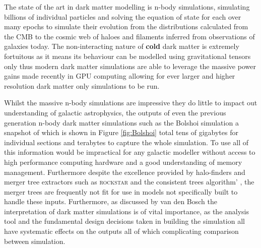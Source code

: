 The state of the art in dark matter modelling is n-body simulations, simulating billions of individual particles and solving the equation of state for each over many epochs to simulate their evolution from the distributions calculated from the CMB to the cosmic web of haloes and filaments inferred from observations of galaxies today. The non-interacting nature of \textbf{cold} dark matter is extremely fortuitous as it means its behaviour can be modelled using gravitational tensors only thus modern dark matter simulations are able to leverage the massive power gains made recently in GPU computing allowing for ever larger and higher resolution dark matter only simulations to be run. 

Whilst the massive n-body simulations are impressive they do little to impact out understanding of galactic astrophysics, the outputs of even the previous generation n-body dark matter simulations such as the Bolshoi simulation a snapshot of which is shown in Figure \ref{fig:Bolshoi} total tens of gigabytes for individual sections and terabytes to capture the whole simulation. To use all of this information would be impractical for any galactic modeller without access to high performance computing hardware and a good understanding of memory management. Furthermore despite the excellence provided by halo-finders and merger tree extractors such as \textsc{rockstar} \cite{Behroozi2013THECORES} and the consistent trees algorithm' \cite{Behroozi2013GRAVITATIONALLYCOSMOLOGY}, the merger trees are frequently not fit for use in models not specifically built to handle these inputs. Furthermore, as discussed by van den Bosch \cite{vandenBosch2014ComingWells, vandenBosch2017DissectingSimulation, vandenBosch2018DisruptionFiction} the interpretation of dark matter simulations is of vital importance, as the analysis tool and the fundamental design decisions taken in building the simulation all have systematic effects on the outputs all of which complicating comparison between simulation.


